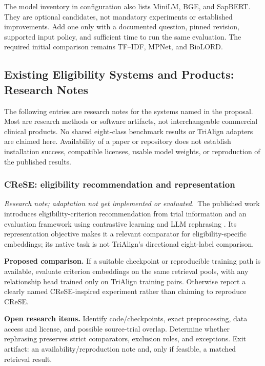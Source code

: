 \documentclass[10pt,letterpaper]{article}
\newcommand{\research}{\textit{Research note; adaptation not yet implemented or evaluated.}}
\begin{document}
The model inventory in configuration also lists MiniLM, BGE, and SapBERT.
They are optional candidates, not mandatory experiments or established
improvements. Add one only with a documented question, pinned revision,
supported input policy, and sufficient time to run the same evaluation.
The required initial comparison remains TF--IDF, MPNet, and BioLORD.

\subsection{Existing Eligibility Systems and Products: Research Notes}
\label{sec:systems}
The following entries are research notes for the systems named in the
proposal. Most are research methods or software artifacts, not interchangeable
commercial clinical products. No shared eight-class benchmark results or
TriAlign adapters are claimed here. Availability of a paper or repository
does not establish installation success, compatible licenses, usable model
weights, or reproduction of the published results.

\subsubsection{CReSE: eligibility recommendation and representation}
\research\ The published work introduces eligibility-criterion recommendation
from trial information and an evaluation framework using contrastive learning
and LLM rephrasing \cite{crese}. Its representation objective makes it a
relevant comparator for eligibility-specific embeddings; its native task is
not TriAlign's directional eight-label comparison.

\textbf{Proposed comparison.} If a suitable checkpoint or reproducible
training path is available, evaluate criterion embeddings on the same
retrieval pools, with any relationship head trained only on TriAlign training
pairs. Otherwise report a clearly named CReSE-inspired experiment rather
than claiming to reproduce CReSE.

\textbf{Open research items.} Identify code/checkpoints, exact preprocessing,
data access and license, and possible source-trial overlap. Determine whether
rephrasing preserves strict comparators, exclusion roles, and exceptions.
Exit artifact: an availability/reproduction note and, only if feasible, a
matched retrieval result.
\end{document}
